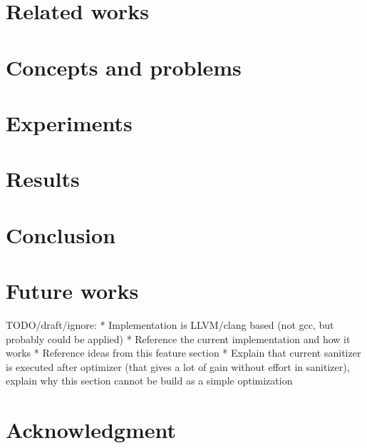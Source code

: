 \documentclass[letterpaper, 10 pt, conference]{llncs}  %
\let\cite\parencite
\begin{document}
\section{Related works}
\section{Concepts and problems}
\section{Experiments}
\section{Results}
\section{Conclusion}
\section{Future works}



TODO/draft/ignore:
* Implementation is LLVM/clang based (not gcc, but probably could be applied)
* Reference the current implementation \cite{serebryany2012addresssanitizer} and how it works
* Reference \cite{serebryany2012addresssanitizer} ideas from this feature section
* Explain that current sanitizer is executed after optimizer (that gives a lot of gain without effort in sanitizer), explain why this section cannot be build as a simple optimization




\addtolength{\textheight}{-12cm}   %








\section*{Acknowledgment}




\printbibliography
\end{document}
